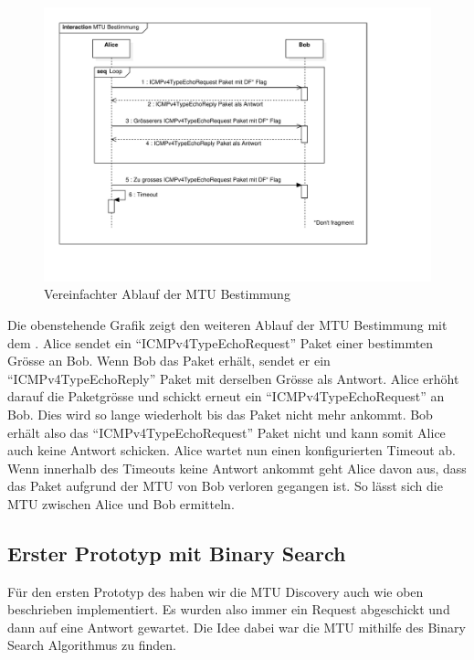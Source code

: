 \begin{figure}[H]
    \begin{center}
        \includegraphics[trim=30 80 140 20,clip,width=\textwidth]{mainpart/implementation/img/MTUBestimmungErfolgreich}
    \end{center}
    \caption{Vereinfachter Ablauf der MTU Bestimmung}
\end{figure}

Die obenstehende Grafik zeigt den weiteren Ablauf der \acs{MTU} Bestimmung mit dem \tool{}. Alice sendet ein \enquote{ICMPv4TypeEchoRequest} Paket einer bestimmten Grösse an Bob. Wenn Bob das Paket erhält, sendet er ein \enquote{ICMPv4TypeEchoReply} Paket mit derselben Grösse als Antwort. Alice erhöht darauf die Paketgrösse und schickt erneut ein \enquote{ICMPv4TypeEchoRequest} an Bob. Dies wird so lange wiederholt bis das Paket nicht mehr ankommt. Bob erhält also das \enquote{ICMPv4TypeEchoRequest} Paket nicht und kann somit Alice auch keine Antwort schicken. Alice wartet nun einen konfigurierten Timeout ab. Wenn innerhalb des Timeouts keine Antwort ankommt geht Alice davon aus, dass das Paket aufgrund der \ac{MTU} von Bob verloren gegangen ist. So lässt sich die \ac{MTU} zwischen Alice und Bob ermitteln.

\subsection{Erster Prototyp mit Binary Search}
Für den ersten Prototyp des \tool{} haben wir die \ac{MTU} Discovery auch wie oben beschrieben implementiert. Es wurden also immer ein Request abgeschickt und dann auf eine Antwort gewartet. Die Idee dabei war die \ac{MTU} mithilfe des Binary Search Algorithmus zu finden. 

